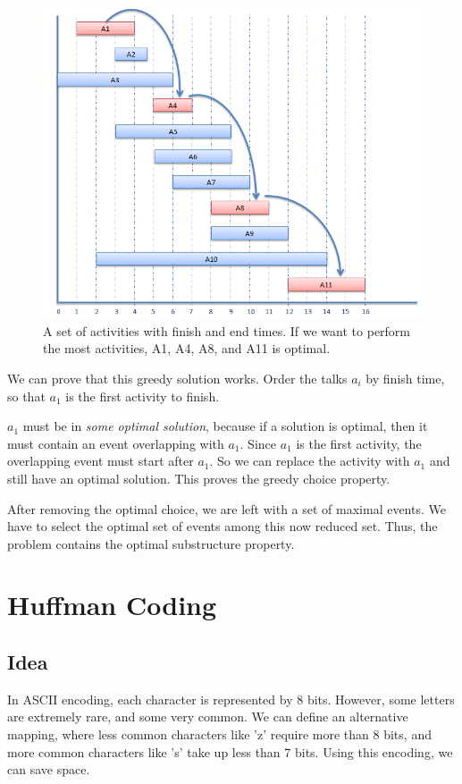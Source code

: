 \documentclass{article}
\begin{document}
\begin{figure}
\centering
\includegraphics[scale=0.6]{img/activities.png}
\caption{A set of activities with finish and end times.  If we want to perform the most activities, A1, A4, A8, and A11 is optimal.  \label{activities}}
\end{figure}

We can prove that this greedy solution works.  Order the talks $a_i$ by finish time, so that $a_1$ is the first activity to finish.  

$a_1$ must be in \textit{some optimal solution}, because if a solution is optimal, then it must contain an event overlapping with $a_1$.  Since $a_1$ is the first activity, the overlapping event must start after $a_1$.  So we can replace the activity with $a_1$ and still have an optimal solution.  This proves the greedy choice property.

After removing the optimal choice, we are left with a set of maximal events.  We have to select the optimal set of events among this now reduced set.  Thus, the problem contains the optimal substructure property.

\section{Huffman Coding}
\subsection{Idea}
In ASCII encoding, each character is represented by 8 bits.  However, some letters are extremely rare, and some very common.  We can define an alternative mapping, where less common characters like 'z' require more than 8 bits, and more common characters like 's' take up less than 7 bits.  Using this encoding, we can save space.
\end{document}

